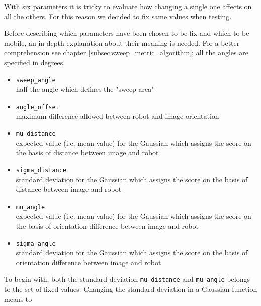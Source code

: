 With six parameters it is tricky to evaluate how changing a single one affects on all the others. For this
reason we decided to fix same values when testing.
%

%
Before describing which parameters have been chosen to be fix and which to be mobile, an in depth explanation
about their meaning is needed. For a better comprehension see chapter \ref{subsec:sweep_metric_algorithm}; all
the angles are specified in degrees.

%
\begin{itemize}

  \item \texttt{sweep\_angle} \\
    half the angle which defines the "sweep area" 
  \item \texttt{angle\_offset} \\
    maximum difference allowed between robot and image orientation 

  \item \texttt{mu\_distance} \\
    expected value (i.e. mean value) for the Gaussian which assigns the score on the basis of distance between
    image and robot
  \item \texttt{sigma\_distance} \\
    standard deviation for the Gaussian which assigns the score on the basis of distance between image and robot

  \item \texttt{mu\_angle} \\
    expected value (i.e. mean value) for the Gaussian which assigns the score on the basis of orientation difference
    between image and robot
  \item \texttt{sigma\_angle} \\
    standard deviation for the Gaussian which assigns the score on the basis of orientation difference between image
    and robot

\end{itemize}
%

To begin with, both the standard deviation \texttt{mu\_distance} and \texttt{mu\_angle} belongs to the set of fixed
values. Changing the standard deviation in a Gaussian function means to 

